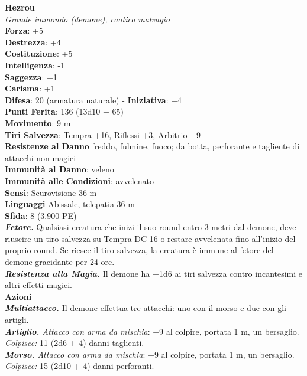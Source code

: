 \begin{multicols}{2}
\medskip\textbf{Hezrou}\\
\emph{Grande immondo (demone), caotico malvagio}\\
\textbf{Forza}: +5\\
\textbf{Destrezza}: +4\\
\textbf{Costituzione}: +5\\
\textbf{Intelligenza}: -1\\
\textbf{Saggezza}: +1\\
\textbf{Carisma}: +1\\
\textbf{Difesa}: 20 (armatura naturale) - \textbf{Iniziativa}: +4\\
\textbf{Punti Ferita}: 136 (13d10 + 65)\\
\textbf{Movimento}: 9 m\\
\textbf{Tiri Salvezza}: Tempra +16, Riflessi +3, Arbitrio +9\\
\textbf{Resistenze al Danno} freddo, fulmine, fuoco; da botta, perforante e tagliente di attacchi non magici\\
\textbf{Immunità al Danno}: veleno\\
\textbf{Immunità alle Condizioni}: avvelenato\\
\textbf{Sensi}: Scurovisione 36 m\\
\textbf{Linguaggi} Abissale, telepatia 36 m \\
\textbf{Sfida}: 8 (3.900 PE)\smallskip\\
\emph{\textbf{Fetore.}} Qualsiasi creatura che inizi il suo round entro 3 metri dal demone, deve riuscire un tiro salvezza su Tempra DC  16 o restare avvelenata fino all'inizio del proprio round. Se riesce il tiro salvezza, la creatura è immune al fetore del demone gracidante per 24 ore.\\
\emph{\textbf{Resistenza alla Magia.}} Il demone ha +1d6 ai tiri salvezza contro incantesimi e altri effetti magici.\\
\smallskip\textbf{Azioni}\\
\emph{\textbf{Multiattacco.}} Il demone effettua tre attacchi: uno con il morso e due con gli artigli.\\
\emph{\textbf{Artiglio.} Attacco con arma da mischia}: +9 al colpire, portata 1 m, un bersaglio.\\
\emph{Colpisce:} 11 (2d6 + 4) danni taglienti. \\
\emph{\textbf{Morso.} Attacco con arma da mischia}: +9 al colpire, portata 1 m, un bersaglio.\\
\emph{Colpisce:} 15 (2d10 + 4) danni perforanti.\\

\end{multicols}
